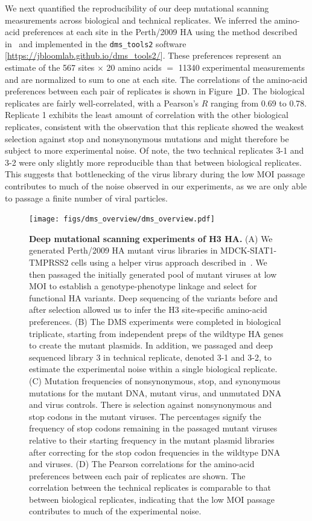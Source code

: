 \documentclass[11pt]{article}
\begin{document}
We next quantified the reproducibility of our deep mutational scanning measurements across biological and technical replicates. 
We inferred the amino-acid preferences at each site in the Perth/2009 HA using the method described in~\cite{bloom2015software} and implemented in the \texttt{dms\_tools2} software [\url{https://jbloomlab.github.io/dms_tools2/}].
These preferences represent an estimate of the 567 sites $\times$ 20 amino acids $=$ 11340 experimental measurements and are normalized to sum to one at each site.
The correlations of the amino-acid preferences between each pair of replicates is shown in Figure~\ref{fig:dms_overview}D.
The biological replicates are fairly well-correlated, with a Pearson's $R$ ranging from 0.69 to 0.78. 
Replicate 1 exhibits the least amount of correlation with the other biological replicates, consistent with the observation that this replicate showed the weakest selection against stop and nonsynonymous mutations and might therefore be subject to more experimental noise.
Of note, the two technical replicates 3-1 and 3-2 were only slightly more reproducible than that between biological replicates.
This suggests that bottlenecking of the virus library during the low MOI passage contributes to much of the noise observed in our experiments, as we are only able to passage a finite number of viral particles.

\begin{figure}
\centerline{\texttt{[image: figs/dms\_overview/dms\_overview.pdf]}}
\caption{\label{fig:dms_overview}
{\bf Deep mutational scanning experiments of H3 HA.}
(A) We generated Perth/2009 HA mutant virus libraries in MDCK-SIAT1-TMPRSS2 cells using a helper virus approach described in~\cite{doud2016accurate}.
We then passaged the initially generated pool of mutant viruses at low MOI to establish a genotype-phenotype linkage and select for functional HA variants. 
Deep sequencing of the variants before and after selection allowed us to infer the H3 site-specific amino-acid preferences.
(B) The DMS experiments were completed in biological triplicate, starting from independent preps of the wildtype HA genes to create the mutant plasmids. 
In addition, we passaged and deep sequenced library 3 in technical replicate, denoted 3-1 and 3-2, to estimate the experimental noise within a single biological replicate.
(C) Mutation frequencies of nonsynonymous, stop, and synonymous mutations for the mutant DNA, mutant virus, and unmutated DNA and virus controls. 
There is selection against nonsynonymous and stop codons in the mutant viruses. 
The percentages signify the frequency of stop codons remaining in the passaged mutant viruses relative to their starting frequency in the mutant plasmid libraries after correcting for the stop codon frequencies in the wildtype DNA and viruses.
(D) The Pearson correlations for the amino-acid preferences between each pair of replicates are shown. 
The correlation between the technical replicates is comparable to that between biological replicates, indicating that the low MOI passage contributes to much of the experimental noise. 
}
\end{figure}
\end{document}
